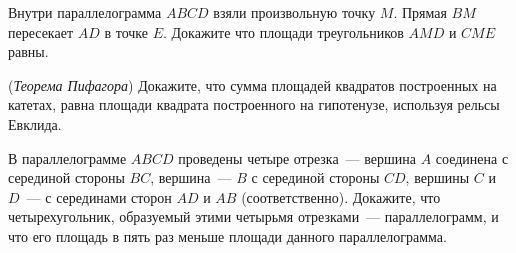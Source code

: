 \begin{problems}
\item
Внутри параллелограмма $ABCD$ взяли произвольную точку $M$. Прямая $BM$ пересекает $AD$ в точке $E$. Докажите что площади треугольников $AMD$ и $CME$ равны.


\item (\textit{Теорема Пифагора})
Докажите, что сумма площадей квадратов построенных на катетах, равна площади квадрата построенного на гипотенузе, используя рельсы Евклида.

\item В параллелограмме $ABCD$ проведены четыре отрезка~--- вершина $A$ соединена с серединой стороны $BC$, вершина~--- $B$ с серединой стороны $CD$, вершины $C$ и $D$~--- с серединами сторон $AD$ и $AB$ (соответственно). Докажите, что четырехугольник, образуемый этими четырьмя отрезками~--- параллелограмм, и что его площадь в пять раз меньше площади данного параллелограмма.
\end{problems}

\newpage


